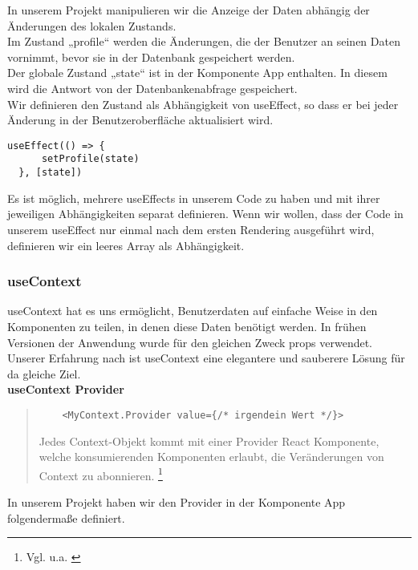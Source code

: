In unserem Projekt manipulieren wir die Anzeige der Daten abhängig der Änderungen des lokalen Zustands.\\
Im Zustand „profile“ werden die Änderungen, die der Benutzer an seinen Daten vornimmt, bevor sie in der Datenbank gespeichert werden.
\\
Der globale Zustand „state“ ist in der Komponente App enthalten.
In diesem wird die Antwort von der Datenbankenabfrage gespeichert.
\\
Wir definieren den Zustand als Abhängigkeit von useEffect, so dass er bei jeder Änderung in der Benutzeroberfläche aktualisiert wird.
\\
\begin{lstlisting}
useEffect(() => { 
      setProfile(state)      
  }, [state])           
\end{lstlisting}

Es ist möglich, mehrere useEffects in unserem Code zu haben und mit ihrer jeweiligen Abhängigkeiten separat definieren.
Wenn wir wollen, dass der Code in unserem useEffect nur einmal nach dem ersten Rendering ausgeführt wird, definieren wir ein leeres Array als Abhängigkeit.
\newpage

\subsubsection{useContext}
useContext hat es uns ermöglicht, Benutzerdaten auf einfache Weise in den Komponenten zu teilen, in denen diese Daten benötigt werden. In frühen Versionen der Anwendung wurde für den gleichen Zweck props verwendet.
Unserer Erfahrung nach ist useContext eine elegantere und sauberere Lösung für da gleiche Ziel.
\\
\textbf{useContext Provider} \\

\begin{quote}
    \begin{lstlisting}
    <MyContext.Provider value={/* irgendein Wert */}>
    \end{lstlisting}

    Jedes Context-Objekt kommt mit einer Provider React Komponente, welche konsumierenden Komponenten erlaubt, die Veränderungen von Context zu abonnieren.
    \footnote{Vgl. u.a. \cite{R02}}
    \end{quote}

In unserem Projekt haben wir den Provider in der Komponente App folgendermaße definiert.

